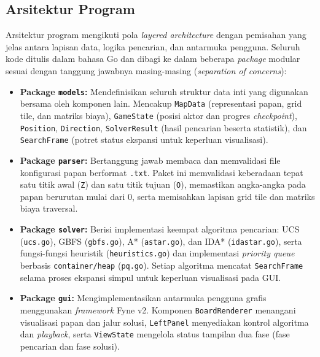 \documentclass[12pt,a4paper]{article}
\begin{document}
\subsection{Arsitektur Program}
Arsitektur program mengikuti pola \textit{layered architecture} dengan pemisahan yang jelas antara lapisan data, logika pencarian, dan antarmuka pengguna. Seluruh kode ditulis dalam bahasa Go dan dibagi ke dalam beberapa \textit{package} modular sesuai dengan tanggung jawabnya masing-masing (\textit{separation of concerns}):
\begin{itemize}
    \item \textbf{Package \texttt{models}:} Mendefinisikan seluruh struktur data
    inti yang digunakan bersama oleh komponen lain. Mencakup \texttt{MapData}
    (representasi papan, grid tile, dan matriks biaya), \texttt{GameState} (posisi
    aktor dan progres \textit{checkpoint}), \texttt{Position}, \texttt{Direction},
    \texttt{SolverResult} (hasil pencarian beserta statistik), dan \texttt{SearchFrame}
    (potret status ekspansi untuk keperluan visualisasi).

    \item \textbf{Package \texttt{parser}:} Bertanggung jawab membaca dan memvalidasi
    file konfigurasi papan berformat \texttt{.txt}. Paket ini memvalidasi keberadaan
    tepat satu titik awal (\texttt{Z}) dan satu titik tujuan (\texttt{O}), memastikan
    angka-angka pada papan berurutan mulai dari 0, serta memisahkan lapisan grid
    tile dan matriks biaya traversal.

    \item \textbf{Package \texttt{solver}:} Berisi implementasi keempat algoritma
    pencarian: UCS (\texttt{ucs.go}), GBFS (\texttt{gbfs.go}), A* (\texttt{astar.go}),
    dan IDA* (\texttt{idastar.go}), serta fungsi-fungsi heuristik (\texttt{heuristics.go})
    dan implementasi \textit{priority queue} berbasis \texttt{container/heap}
    (\texttt{pq.go}). Setiap algoritma mencatat \texttt{SearchFrame} selama proses
    ekspansi simpul untuk keperluan visualisasi pada GUI.

    \item \textbf{Package \texttt{gui}:} Mengimplementasikan antarmuka pengguna
    grafis menggunakan \textit{framework} Fyne v2. Komponen \texttt{BoardRenderer}
    menangani visualisasi papan dan jalur solusi, \texttt{LeftPanel} menyediakan
    kontrol algoritma dan \textit{playback}, serta \texttt{ViewState} mengelola
    status tampilan dua fase (fase pencarian dan fase solusi).
\end{itemize}
\end{document}
